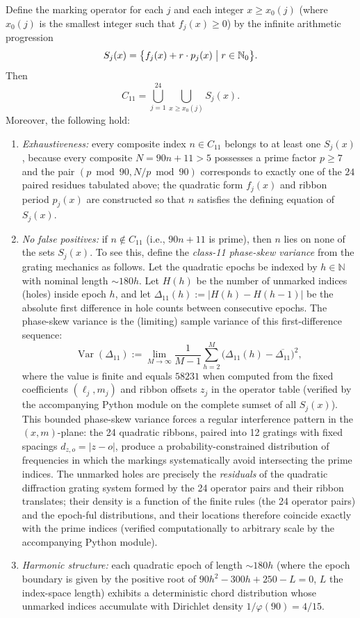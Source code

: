 \documentclass[11pt,a4paper]{article}
\begin{document}
Define the marking operator for each \(j\) and each integer \(x \ge x_0(j)\) (where \(x_0(j)\) is the smallest integer such that \(f_j(x) \ge 0\)) by the infinite arithmetic progression
\[
S_j(x) = \bigl\{ f_j(x) + r \cdot p_j(x) \bigm| r \in \mathbb{N}_0 \bigr\}.
\]
Then
\[
C_{11} = \bigcup_{j=1}^{24} \bigcup_{x \ge x_0(j)} S_j(x).
\]
Moreover, the following hold:
\begin{enumerate}
\item[(i)] \emph{Exhaustiveness:} every composite index \(n \in C_{11}\) belongs to at least one \(S_j(x)\), because every composite \(N = 90n + 11 > 5\) possesses a prime factor \(p \ge 7\) and the pair \((p \bmod 90, N/p \bmod 90)\) corresponds to exactly one of the \(24\) paired residues tabulated above; the quadratic form \(f_j(x)\) and ribbon period \(p_j(x)\) are constructed so that \(n\) satisfies the defining equation of \(S_j(x)\).





\item[(ii)] \emph{No false positives:} if \(n \notin C_{11}\) (i.e., \(90n + 11\) is prime), then \(n\) lies on none of the sets \(S_j(x)\). To see this, define the \emph{class-11 phase-skew variance} from the grating mechanics as follows. Let the quadratic epochs be indexed by \(h \in \mathbb{N}\) with nominal length \(\sim 180h\). Let \(H(h)\) be the number of unmarked indices (holes) inside epoch \(h\), and let \(\Delta_{11}(h) := |H(h) - H(h-1)|\) be the absolute first difference in hole counts between consecutive epochs. The phase-skew variance is the (limiting) sample variance of this first-difference sequence:
\[
\operatorname{Var}(\Delta_{11}) := \lim_{M\to\infty} \frac{1}{M-1}\sum_{h=2}^M \bigl(\Delta_{11}(h) - \overline{\Delta_{11}}\bigr)^2,
\]
where the value is finite and equals \(58231\) when computed from the fixed coefficients \((\ell_j,m_j)\) and ribbon offsets \(z_j\) in the operator table (verified by the accompanying Python module on the complete sumset of all \(S_j(x)\)). This bounded phase-skew variance forces a regular interference pattern in the \((x,m)\)-plane: the 24 quadratic ribbons, paired into 12 gratings with fixed spacings \(d_{z,o}=|z-o|\), produce a probability-constrained distribution of frequencies in which the markings systematically avoid intersecting the prime indices. The unmarked holes are precisely the \emph{residuals} of the quadratic diffraction grating system formed by the 24 operator pairs and their ribbon translates; their density is a function of the finite rules (the 24 operator pairs) and the epoch-ful distributions, and their locations therefore coincide exactly with the prime indices (verified computationally to arbitrary scale by the accompanying Python module).






\item[(iii)] \emph{Harmonic structure:} each quadratic epoch of length \(\sim 180h\) (where the epoch boundary is given by the positive root of \(90h^2 - 300h + 250 - L = 0\), \(L\) the index-space length) exhibits a deterministic chord distribution whose unmarked indices accumulate with Dirichlet density \(1/\varphi(90) = 4/15\).
\end{enumerate}
\end{document}
